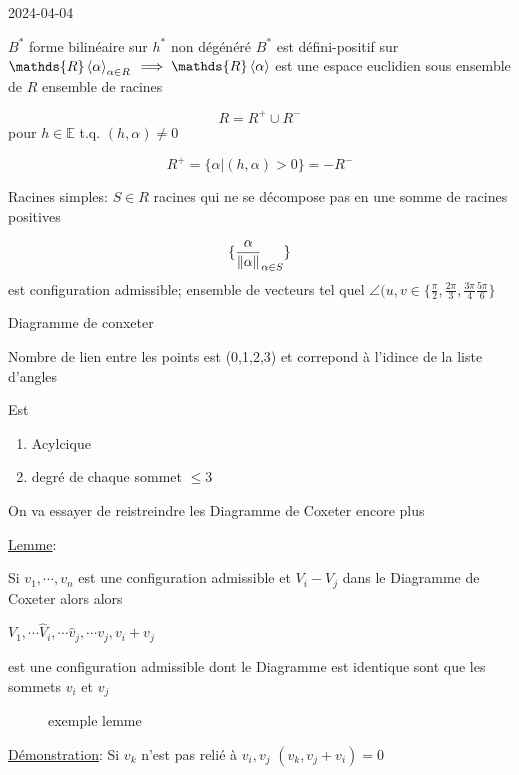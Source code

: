 


2024-04-04

\begin{tcolorbox}[title=Rappels]
	\(B^{*}\) forme bilinéaire sur \(h^{*}\) non dégénéré 
\(B^{*}\) est défini-positif sur \(\mathds{R} \expval{\alpha}_{\alpha\in R}  \)
	\(\implies \mathds{R}\expval{\alpha}\) est une espace euclidien sous ensemble de \(R\) ensemble de racines


	\[ R = R^{+} \cup R^{-} \] pour \(h \in \mathds{E}\) t.q. \((h,\alpha) \neq 0\)

	\[ R^{+} = \{ \alpha | (h,\alpha) > 0 \} = -R^{-} \]


Racines simples: \(S \in R\) racines qui ne se décompose pas en une somme de racines positives

\[ \{ \frac{\alpha}{\norm{\alpha} }_{\alpha\in S}   \}  \]
est configuration admissible; ensemble de vecteurs tel quel \(\angle (u,v \in \{ \frac{\pi}{2}, \frac{2\pi}{3} ,  \frac{3\pi}{4} \frac{5\pi}{6}  \} \)

Diagramme de conxeter

Nombre de lien entre les points est (0,1,2,3) et correpond à l'idince de la liste d'angles

Est 
\begin{enumerate}
	\item Acylcique
	\item degré de chaque sommet \(\leq 3\)
\end{enumerate}

\end{tcolorbox}

On va essayer de reistreindre les Diagramme de Coxeter encore plus

\underline{Lemme}: 

Si \(v_{1}, \dotsb , v_n \) est une configuration admissible et \(V_i - V_j \) dans le Diagramme de Coxeter alors alors 

\(V_1 , \dotsb \hat V _i , \dotsb \hat v_j , \dotsb v_j , v_i + v_j \)

est une configuration admissible dont le Diagramme est identique sont que les sommets \(v_i \) et \(v_j \)

\begin{figure}[h!]
    \centering
    \caption{exemple lemme}
    \label{fig:exemple-lemme}
\end{figure}

\underline{Démonstration}: Si \(v_k\)  n'est pas relié à \(v_i, v_j\)
\((v_k , v_j + v_i ) = 0   \)

